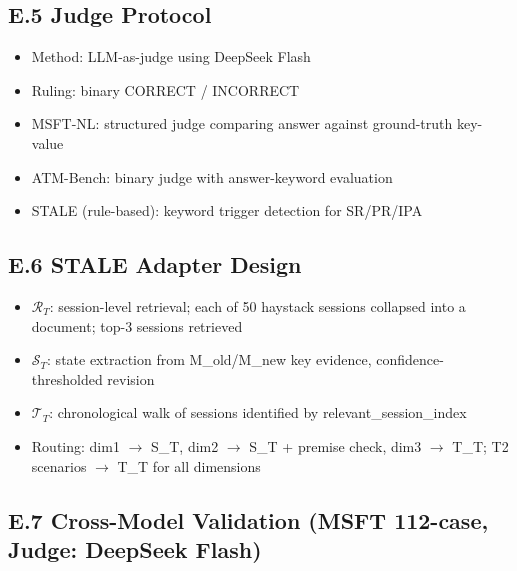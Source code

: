 \documentclass[letterpaper,twocolumn,10pt]{article}
\begin{document}
\subsection*{E.5 Judge Protocol}
\begin{itemize}
\item Method: LLM-as-judge using DeepSeek Flash
\item Ruling: binary CORRECT / INCORRECT
\item MSFT-NL: structured judge comparing answer against ground-truth key-value
\item ATM-Bench: binary judge with answer-keyword evaluation
\item STALE (rule-based): keyword trigger detection for SR/PR/IPA
\end{itemize}

\subsection*{E.6 STALE Adapter Design}
\begin{itemize}
\item $\mathcal{R}_T$: session-level retrieval; each of 50 haystack sessions collapsed into a document; top-3 sessions retrieved
\item $\mathcal{S}_T$: state extraction from M\_old/M\_new key evidence, confidence-thresholded revision
\item $\mathcal{T}_T$: chronological walk of sessions identified by relevant\_session\_index
\item Routing: dim1 $\rightarrow$ S\_T, dim2 $\rightarrow$ S\_T + premise check, dim3 $\rightarrow$ T\_T; T2 scenarios $\rightarrow$ T\_T for all dimensions
\end{itemize}

\subsection*{E.7 Cross-Model Validation (MSFT 112-case, Judge: DeepSeek Flash)}

\begin{table}[h]
\centering
{}
\end{table}
\end{document}
